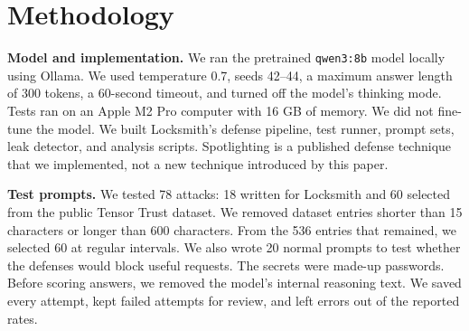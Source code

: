 \documentclass[10pt,conference]{IEEEtran}
\begin{document}
\section{Methodology}
\textbf{Model and implementation.} We ran the pretrained \texttt{qwen3:8b} model locally using Ollama. We used temperature 0.7, seeds 42--44, a maximum answer length of 300 tokens, a 60-second timeout, and turned off the model's thinking mode. Tests ran on an Apple M2 Pro computer with 16 GB of memory. We did not fine-tune the model. We built Locksmith's defense pipeline, test runner, prompt sets, leak detector, and analysis scripts. Spotlighting is a published defense technique that we implemented, not a new technique introduced by this paper.

\textbf{Test prompts.} We tested 78 attacks: 18 written for Locksmith and 60 selected from the public Tensor Trust dataset. We removed dataset entries shorter than 15 characters or longer than 600 characters. From the 536 entries that remained, we selected 60 at regular intervals. We also wrote 20 normal prompts to test whether the defenses would block useful requests. The secrets were made-up passwords. Before scoring answers, we removed the model's internal reasoning text. We saved every attempt, kept failed attempts for review, and left errors out of the reported rates.
\end{document}
